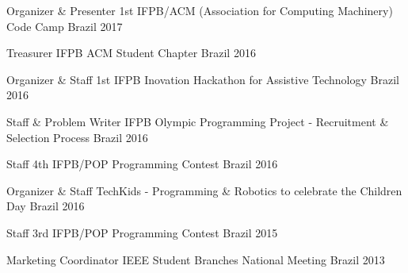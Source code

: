 

\begin{cvhonors}


\cvhonor
    {Organizer \& Presenter} %
    {1st IFPB/ACM (Association for Computing Machinery) Code Camp} %
    {Brazil} %
    {2017} %

  \cvhonor
    {Treasurer} %
    {IFPB ACM Student Chapter} %
    {Brazil} %
    {2016} %

  \cvhonor
    {Organizer \& Staff} %
    {1st IFPB Inovation Hackathon for Assistive Technology} %
    {Brazil} %
    {2016} %

  \cvhonor
    {Staff \& Problem Writer} %
    {IFPB Olympic Programming Project - Recruitment \& Selection Process} %
    {Brazil} %
    {2016} %
    
  \cvhonor
    {Staff} %
    {4th IFPB/POP Programming Contest} %
    {Brazil} %
    {2016} %
    
  \cvhonor
    {Organizer \& Staff} %
    {TechKids - Programming \& Robotics to celebrate the Children Day} %
    {Brazil} %
    {2016} %

  \cvhonor
    {Staff} %
    {3rd IFPB/POP Programming Contest} %
    {Brazil} %
    {2015} %

  \cvhonor
    {Marketing Coordinator} %
    {IEEE Student Branches National Meeting} %
    {Brazil} %
    {2013} %


\end{cvhonors}
